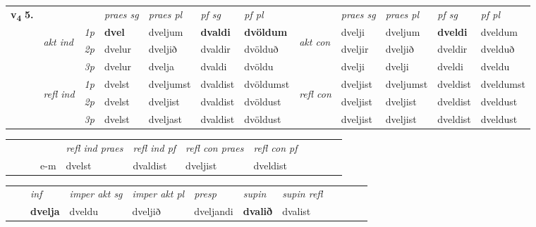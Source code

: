 \begin{tabular}{llllllllllll} \toprule
\multirow{4}{*}{{{\textbf{v{\textsubscript{4}}} \Large{\textbf{5.}}}}}  & &   &  \textit{praes sg}  & \textit{praes pl}  &\textit{ pf sg} & \textit{pf pl} &  &  \textit{praes sg}  & \textit{praes pl}  & \textit{pf sg} & \textit{pf pl } \\*
	\cmidrule{4-7} \cmidrule{9-12}
 & \multirow{3}{*}{\begin{turn}{90}\textit{akt ind}\end{turn}} & {\textit{1p}} & \textbf{dvel} & dveljum    & \textbf{dvaldi} & \textbf{dvöldum} & \multirow{3}{*}{\begin{turn}{90}\textit{akt con}\end{turn}} &dvelji & dveljum & \textbf{dveldi} & dveldum\\*
& &  {\textit{2p}} &  dvelur  & dveljið   & dvaldir & dvölduð & & dveljir & dveljið & dveldir & dvelduð \\*
& &  {\textit{3p}} & dvelur & dvelja   & dvaldi & dvöldu & & dvelji & dvelji& dveldi & dveldu  \\*
\cmidrule{4-7} \cmidrule{9-12}
 &\multirow{3}{*}{\begin{turn}{90}\textit{refl ind}\end{turn}} & {\textit{1p}} & dvelst & dveljumst    & dvaldist & dvöldumst & \multirow{3}{*}{\begin{turn}{90}\textit{refl con}\end{turn}}  &dveljist & dveljumst & dveldist & dveldumst\\*
 &&  {\textit{2p}} &  dvelst  & dveljist   & dvaldist & dvöldust & &dveljist & dveljist & dveldist & dveldust \\*
& &  {\textit{3p}} & dvelst & dveljast   & dvaldist & dvöldust & & dveljist & dveljist& dveldist & dveldust  \\*
\cmidrule{4-7} \cmidrule{9-12}
\end{tabular}


\begin{tabular}{llllllllllll}
 & &  & &  \textit{refl ind praes} & \textit{refl ind pf} & \textit{refl con praes} & \textit{refl con pf} \\*
&  & & e-m & dvelst & dvaldist & dveljist & dveldist \\*
\cmidrule{5-9}
\end{tabular}


\begin{tabular}{llllllllllll}
 & & \textit{inf} & \textit{imper akt sg} & \textit{imper akt pl}   & \textit{presp} & \textit{supin} & \textit{supin refl}      \\*
  & & \textbf{dvelja} & dveldu  & dveljið   & dveljandi &  \textbf{dvalið} & dvalist  \\*
\cmidrule{1-12}
\end{tabular}



